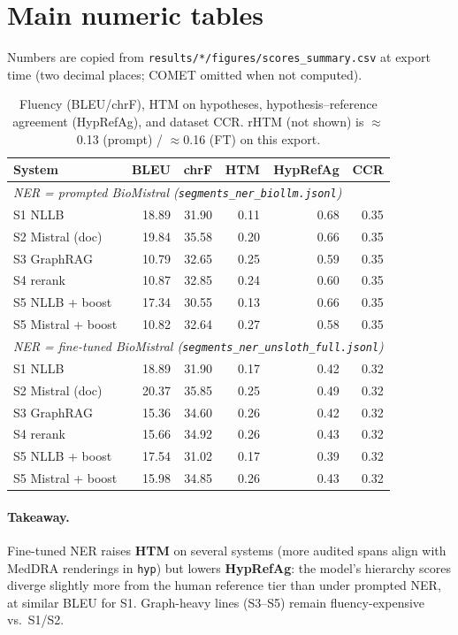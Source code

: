 \documentclass[11pt]{article}
\begin{document}
\section{Main numeric tables}
Numbers are copied from \texttt{results/*/figures/scores\_summary.csv} at export time (two decimal places; COMET omitted when not computed).

\begin{table}[t]
\centering
\small
\begin{tabular}{lrrrrr}
\toprule
\textbf{System} & \textbf{BLEU} & \textbf{chrF} & \textbf{HTM} & \textbf{HypRefAg} & \textbf{CCR} \\
\midrule
\multicolumn{6}{l}{\textit{NER = prompted BioMistral (\texttt{segments\_ner\_biollm.jsonl})}} \\
S1 NLLB & 18.89 & 31.90 & 0.11 & 0.68 & 0.35 \\
S2 Mistral (doc) & 19.84 & 35.58 & 0.20 & 0.66 & 0.35 \\
S3 GraphRAG & 10.79 & 32.65 & 0.25 & 0.59 & 0.35 \\
S4 rerank & 10.87 & 32.85 & 0.24 & 0.60 & 0.35 \\
S5 NLLB + boost & 17.34 & 30.55 & 0.13 & 0.66 & 0.35 \\
S5 Mistral + boost & 10.82 & 32.64 & 0.27 & 0.58 & 0.35 \\
\midrule
\multicolumn{6}{l}{\textit{NER = fine-tuned BioMistral (\texttt{segments\_ner\_unsloth\_full.jsonl})}} \\
S1 NLLB & 18.89 & 31.90 & 0.17 & 0.42 & 0.32 \\
S2 Mistral (doc) & 20.37 & 35.85 & 0.25 & 0.49 & 0.32 \\
S3 GraphRAG & 15.36 & 34.60 & 0.26 & 0.42 & 0.32 \\
S4 rerank & 15.66 & 34.92 & 0.26 & 0.43 & 0.32 \\
S5 NLLB + boost & 17.54 & 31.02 & 0.17 & 0.39 & 0.32 \\
S5 Mistral + boost & 15.98 & 34.85 & 0.26 & 0.43 & 0.32 \\
\bottomrule
\end{tabular}
\caption{Fluency (BLEU/chrF), HTM on hypotheses, hypothesis--reference agreement (HypRefAg), and dataset CCR. rHTM (not shown) is $\approx$0.13 (prompt) / $\approx$0.16 (FT) on this export.}
\label{tab:main}
\end{table}

\paragraph{Takeaway.} Fine-tuned NER raises \textbf{HTM} on several systems (more audited spans align with MedDRA renderings in \texttt{hyp}) but lowers \textbf{HypRefAg}: the model's hierarchy scores diverge slightly more from the human reference tier than under prompted NER, at similar BLEU for S1. Graph-heavy lines (S3--S5) remain fluency-expensive vs.\ S1/S2.
\end{document}
